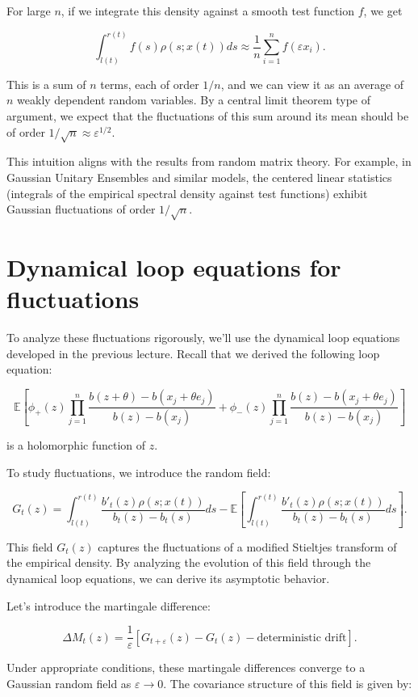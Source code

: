 \documentclass[letterpaper,11pt,oneside,reqno]{article}
\numberwithin{equation}{section}
\theoremstyle{definition}
\begin{document}
For large $n$, if we integrate this density against a smooth test function $f$, we get

$$\int_{l(t)}^{r(t)} f(s)\rho(s; x(t))ds \approx \frac{1}{n}\sum_{i=1}^n f(\varepsilon x_i).$$

This is a sum of $n$ terms, each of order $1/n$, and we can view it as an average of $n$ weakly dependent random variables. By a central limit theorem type of argument, we expect that the fluctuations of this sum around its mean should be of order $1/\sqrt{n} \approx \varepsilon^{1/2}$.

This intuition aligns with the results from random matrix theory. For example, in Gaussian Unitary Ensembles and similar models, the centered linear statistics (integrals of the empirical spectral density against test functions) exhibit Gaussian fluctuations of order $1/\sqrt{n}$.

\section{Dynamical loop equations for fluctuations}

To analyze these fluctuations rigorously, we'll use the dynamical loop equations developed in the previous lecture. Recall that we derived the following loop equation:

$$\mathbb{E}\left[\phi_+(z) \prod_{j=1}^n \frac{b(z + \theta) - b(x_j + \theta e_j)}{b(z) - b(x_j)} + \phi_-(z) \prod_{j=1}^n \frac{b(z) - b(x_j + \theta e_j)}{b(z) - b(x_j)}\right]$$

is a holomorphic function of $z$.

To study fluctuations, we introduce the random field:

$$G_t(z) = \int_{l(t)}^{r(t)} \frac{b'_t(z)\rho(s; x(t))}{b_t(z) - b_t(s)}ds - \mathbb{E}\left[\int_{l(t)}^{r(t)} \frac{b'_t(z)\rho(s; x(t))}{b_t(z) - b_t(s)}ds\right].$$

This field $G_t(z)$ captures the fluctuations of a modified Stieltjes transform of the empirical density. By analyzing the evolution of this field through the dynamical loop equations, we can derive its asymptotic behavior.

Let's introduce the martingale difference:

$$\Delta M_t(z) = \frac{1}{\varepsilon}[G_{t+\varepsilon}(z) - G_t(z) - \text{deterministic drift}].$$

Under appropriate conditions, these martingale differences converge to a Gaussian random field as $\varepsilon \to 0$. The covariance structure of this field is given by:
\end{document}
